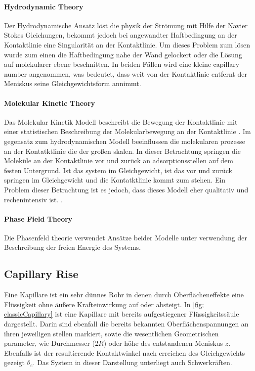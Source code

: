 \paragraph{Hydrodynamic Theory}
Der Hydrodynamische Ansatz löst die physik der Strömung mit Hilfe der Navier Stokes Gleichungen, bekommt jedoch bei angewandter Haftbedingung an der Kontaktlinie eine Singularität an der Kontaktlinie. Um dieses Problem zum lösen wurde zum einen die Haftbedingung nahe der Wand gelockert oder die Lösung auf molekularer ebene beschnitten\cite{blake2006PhysicsMovingWetting}. In beiden Fällen wird eine kleine capillary number angenommen, was bedeutet, dass weit von der Kontaktlinie entfernt der Meniskus seine Gleichgewichtsform annimmt. 


\paragraph{Molekular Kinetic Theory}
Das Molekular Kinetik Modell beschreibt die Bewegung der Kontaktlinie mit einer statistischen Beschreibung der Molekularbewegung an der Kontaktlinie \cite{blake1969KineticsDisplacement}. Im gegensatz zum hydrodynamischen Modell beeinflussen die molekularen prozesse an der Kontatktlinie die der großen skalen. In dieser Betrachtung springen die Moleküle an der Kontaktlinie vor und zurück an adsorptionsstellen auf dem festen Untergrund. Ist das system im Gleichgewicht, ist das vor und zurück springen im Gleichgewicht und die Kontatktlinie kommt zum stehen. Ein Problem dieser Betrachtung ist es jedoch, dass dieses Modell eher qualitativ und rechenintensiv ist. . 

\paragraph{Phase Field Theory}
Die Phasenfeld theorie verwendet Ansätze beider Modelle unter verwendung der Beschreibung der freien Energie des Systems.




\subsection{Capillary Rise}
Eine Kapillare ist ein sehr dünnes Rohr in denen durch Oberflächeneffekte eine Flüssigkeit ohne äußere Krafteinwirkung auf oder absteigt. In \ref{fig: classicCapillary} ist eine Kapillare mit bereits aufgestiegener Flüssigkeitssäule dargestellt. Darin sind ebenfall die bereits bekannten Oberflächenspannungen an ihren jeweiligen stellen markiert, sowie die wesentlichen Geometrischen parameter, wie Durchmesser ($2R$) oder höhe des entstandenen Meniskus $z$. Ebenfalls ist der resultierende Kontaktwinkel nach erreichen des Gleichgewichts gezeigt $\theta_e$. Das System in dieser Darstellung unterliegt auch Schwerkräften. 

